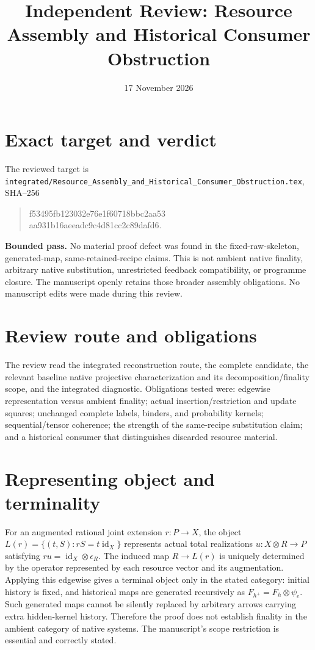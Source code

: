 \documentclass{article}
\title{Independent Review: Resource Assembly and Historical Consumer Obstruction}
\date{17 November 2026}
\begin{document}
\maketitle
\section*{Exact target and verdict}
The reviewed target is \texttt{integrated/Resource\_Assembly\_and\_Historical\_Consumer\_Obstruction.tex}, SHA--256
\begin{quote}\ttfamily\small
f53495fb123032e76e1f60718bbc2aa53\\aa931b16aeeadc9c4d81cc2c89dafd6.
\end{quote}
\textbf{Bounded pass.} No material proof defect was found in the fixed-raw-skeleton, generated-map, same-retained-recipe claims. This is not ambient native finality, arbitrary native substitution, unrestricted feedback compatibility, or programme closure. The manuscript openly retains those broader assembly obligations. No manuscript edits were made during this review.

\section*{Review route and obligations}
The review read the integrated reconstruction route, the complete candidate, the relevant baseline native projective characterization and its decomposition/finality scope, and the integrated diagnostic. Obligations tested were: edgewise representation versus ambient finality; actual insertion/restriction and update squares; unchanged complete labels, binders, and probability kernels; sequential/tensor coherence; the strength of the same-recipe substitution claim; and a historical consumer that distinguishes discarded resource material.

\section*{Representing object and terminality}
For an augmented rational joint extension $r:P\to X$, the object
$L(r)=\{(t,S):rS=t\operatorname{id}_X\}$ represents actual total realizations $u:X\otimes R\to P$ satisfying $ru=\operatorname{id}_X\otimes\epsilon_R$. The induced map $R\to L(r)$ is uniquely determined by the operator represented by each resource vector and its augmentation. Applying this edgewise gives a terminal object only in the stated category: initial history is fixed, and historical maps are generated recursively as $F_{h^+}=F_h\otimes\psi_e$. Such generated maps cannot be silently replaced by arbitrary arrows carrying extra hidden-kernel history. Therefore the proof does not establish finality in the ambient category of native systems. The manuscript's scope restriction is essential and correctly stated.
\end{document}
